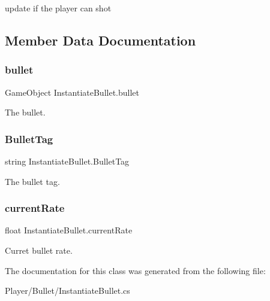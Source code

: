update if the player can shot 



\subsection{Member Data Documentation}
\mbox{\label{class_instantiate_bullet_a5f592b6ea8184022a425de7fb34cd1c8}} 
\subsubsection{\texorpdfstring{bullet}{bullet}}
{\footnotesize\ttfamily Game\+Object Instantiate\+Bullet.\+bullet}



The bullet. 

\mbox{\label{class_instantiate_bullet_a3eebc503e154a693e632bf480b2209c4}} 
\subsubsection{\texorpdfstring{Bullet\+Tag}{BulletTag}}
{\footnotesize\ttfamily string Instantiate\+Bullet.\+Bullet\+Tag}



The bullet tag. 

\mbox{\label{class_instantiate_bullet_a6616ff47defe7c35d2ce6bea1b9e871a}} 
\subsubsection{\texorpdfstring{current\+Rate}{currentRate}}
{\footnotesize\ttfamily float Instantiate\+Bullet.\+current\+Rate\hspace{0.3cm}{\ttfamily [private]}}



Curret bullet rate. 



The documentation for this class was generated from the following file\+:\begin{DoxyCompactItemize}
\item 
Player/\+Bullet/Instantiate\+Bullet.\+cs\end{DoxyCompactItemize}

